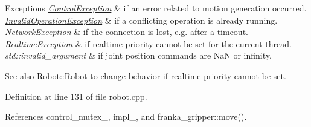 \begin{DoxyExceptions}{Exceptions}
{\em \hyperlink{structfranka_1_1ControlException}{Control\+Exception}} & if an error related to motion generation occurred. \\
\hline
{\em \hyperlink{structfranka_1_1InvalidOperationException}{Invalid\+Operation\+Exception}} & if a conflicting operation is already running. \\
\hline
{\em \hyperlink{structfranka_1_1NetworkException}{Network\+Exception}} & if the connection is lost, e.\+g. after a timeout. \\
\hline
{\em \hyperlink{structfranka_1_1RealtimeException}{Realtime\+Exception}} & if realtime priority cannot be set for the current thread. \\
\hline
{\em std\+::invalid\+\_\+argument} & if joint position commands are NaN or infinity.\\
\hline
\end{DoxyExceptions}
\begin{DoxySeeAlso}{See also}
\hyperlink{classfranka_1_1Robot_ae63bc19390df3d54f3a270814df35eb6}{Robot\+::\+Robot} to change behavior if realtime priority cannot be set. 
\end{DoxySeeAlso}


Definition at line 131 of file robot.\+cpp.



References control\+\_\+mutex\+\_\+, impl\+\_\+, and franka\+\_\+gripper\+::move().



